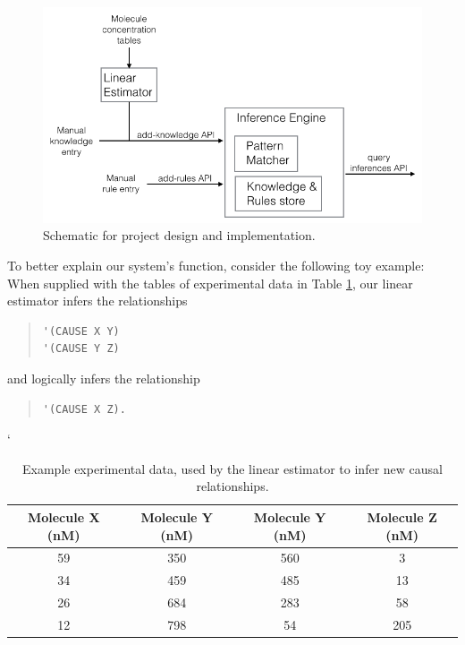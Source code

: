 \documentclass[11pt]{article}
\begin{document}
\begin{figure}[htb]
\centering
\includegraphics[width=.9\linewidth]{../docs/systemdiagram.png}
\caption{\label{fig:system-diagram}Schematic for project design and implementation.}
\end{figure}

To better explain our system's function, consider the following toy example: When supplied with the tables of experimental data in Table \ref{tab:toy-data}, our linear estimator infers the relationships

\begin{quote}
\begin{verbatim}
'(CAUSE X Y)
'(CAUSE Y Z)
\end{verbatim}
\end{quote}

and logically infers the relationship

\begin{quote}
\begin{verbatim}
'(CAUSE X Z).
\end{verbatim}
\end{quote}

\begin{table}[htb]`
\caption{\label{tab:toy-data}Example experimental data, used by the linear estimator to infer new causal relationships.}
\centering
\begin{tabular}{cc|cc}
Molecule X (nM) & Molecule Y (nM) & Molecule Y (nM) & Molecule Z (nM)\\
\hline
59 & 350 & 560 & 3\\
34 & 459 & 485 & 13\\
26 & 684 & 283 & 58\\
12 & 798 & 54 & 205\\
\end{tabular}
\end{table}
\end{document}
